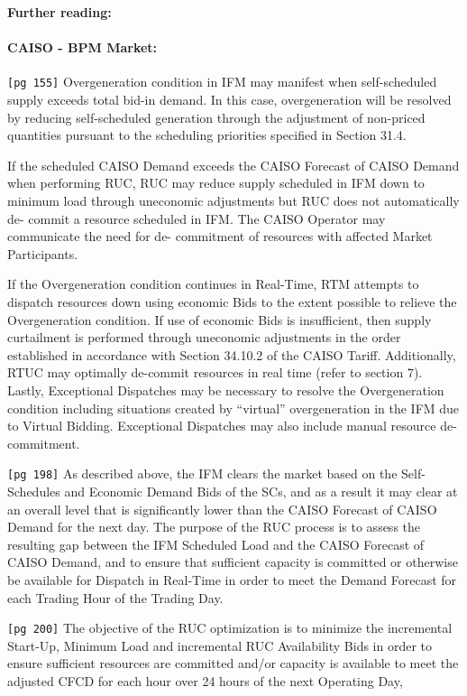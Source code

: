 \documentclass[11pt,a4paper]{article}
\begin{document}
\newpage

\textbf{Further reading: }

\paragraph{CAISO - BPM Market:}

\texttt{[pg 155]} Overgeneration condition in IFM may manifest when self-scheduled supply exceeds total bid-in demand. In this case, overgeneration will be resolved by reducing self-scheduled generation through the adjustment of non-priced quantities pursuant to the scheduling priorities specified in Section 31.4.

If the scheduled CAISO Demand exceeds the CAISO Forecast of CAISO Demand when performing RUC, RUC may reduce supply scheduled in IFM down to minimum load through uneconomic adjustments but RUC does not automatically de- commit a resource scheduled in IFM. The CAISO Operator may communicate the need for de- commitment of resources with affected Market Participants.

If the Overgeneration condition continues in Real-Time, RTM attempts to dispatch resources down using economic Bids to the extent possible to relieve the Overgeneration condition. If use of economic Bids is insufficient, then supply curtailment is performed through uneconomic adjustments in the order established in accordance with Section 34.10.2 of the CAISO Tariff. Additionally, RTUC may optimally de-commit resources in real time (refer to section 7). Lastly, Exceptional Dispatches may be necessary to resolve the Overgeneration condition including situations created by “virtual” overgeneration in the IFM due to Virtual Bidding. Exceptional Dispatches may also include manual resource de-commitment.

\texttt{[pg 198]} As described above, the IFM clears the market based on the Self-Schedules and Economic Demand Bids of the SCs, and as a result it may clear at an overall level that is significantly lower than the CAISO Forecast of CAISO Demand for the next day. The purpose of the RUC process is to assess the resulting gap between the IFM Scheduled Load and the CAISO Forecast of CAISO Demand, and to ensure that sufficient capacity is committed or otherwise be available for Dispatch in Real-Time in order to meet the Demand Forecast for each Trading Hour of the Trading Day.

\texttt{[pg 200]} The objective of the RUC optimization is to minimize the incremental Start-Up, Minimum Load and incremental RUC Availability Bids in order to ensure sufficient resources are committed and/or capacity is available to meet the adjusted CFCD for each hour over 24 hours of the next Operating Day,
\end{document}
